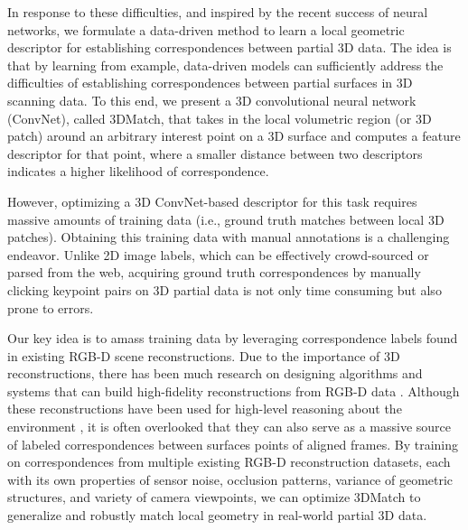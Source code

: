 \documentclass[10pt,twocolumn,letterpaper]{article}
\begin{document}
In response to these difficulties, and inspired by the recent success of neural networks, we formulate a data-driven method to learn a local geometric  descriptor for establishing correspondences between partial 3D data. The idea is that by learning from example, data-driven models can sufficiently address the difficulties of establishing correspondences between partial surfaces in 3D scanning data. To this end, we present a 3D convolutional neural network (ConvNet), called 3DMatch, that takes in the local volumetric region (or 3D patch) around an arbitrary interest point on a 3D surface and computes a feature descriptor for that point, where a smaller distance between two descriptors indicates a higher likelihood of correspondence. 

However, optimizing a 3D ConvNet-based descriptor for this task requires massive amounts of training data (i.e., ground truth matches between local 3D patches). Obtaining this training data with manual annotations is a challenging endeavor. Unlike 2D image labels, which can be effectively crowd-sourced or parsed from the web, acquiring ground truth correspondences by manually clicking keypoint pairs on 3D partial data is not only time consuming but also prone to errors.


Our key idea is to amass training data by leveraging correspondence labels found in existing RGB-D scene reconstructions. Due to the importance of 3D reconstructions, there has been much research on designing algorithms and systems that can build high-fidelity reconstructions from RGB-D data \cite{newcombe2011kinectfusion,niessner2013real,dai2016bundle}.
Although these reconstructions have been used for high-level reasoning about the environment \cite{3DShapeNets,SUN3D}, it is often overlooked that they can also serve as a massive source of labeled correspondences between surfaces points of aligned frames. 
By training on correspondences from multiple existing RGB-D reconstruction datasets, each with its own properties of sensor noise, occlusion patterns, variance of geometric structures, and variety of camera viewpoints, we can optimize 3DMatch to generalize and robustly match local geometry in real-world partial 3D data.
\end{document}
